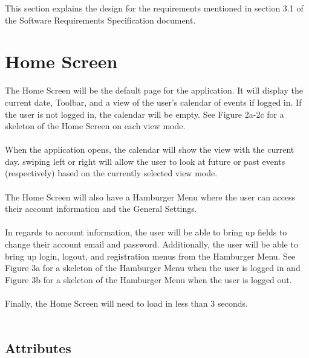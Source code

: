 \documentclass{scrreprt}
\begin{document}
This section explains the design for the requirements mentioned in section 3.1 of the Software Requirements Specification document.

\section{Home Screen}

The Home Screen will be the default page for the application.  It will display the current date, Toolbar, and a view of the user's calendar of events if logged in.  If the user is not logged in, the calendar will be empty. See Figure 2a-2c for a skeleton of the Home Screen on each view mode.\\
\\
When the application opens, the calendar will show the view with the current day.  swiping left or right will allow the user to look at future or past events (respectively) based on the currently selected view mode.\\
\\
The Home Screen will also have a Hamburger Menu where the user can access their account information and the General Settings.\\
\\
In regards to account information, the user will be able to bring up fields to change their account email and password.  Additionally, the user will be able to bring up login, logout, and registration menus from the Hamburger Menu.  See Figure 3a for a skeleton of the Hamburger Menu when the user is logged in and Figure 3b for a skeleton of the Hamburger Menu when the user is logged out.\\
\\
Finally, the Home Screen will need to load in less than 3 seconds. \\
\\

\subsection{Attributes}
\end{document}

